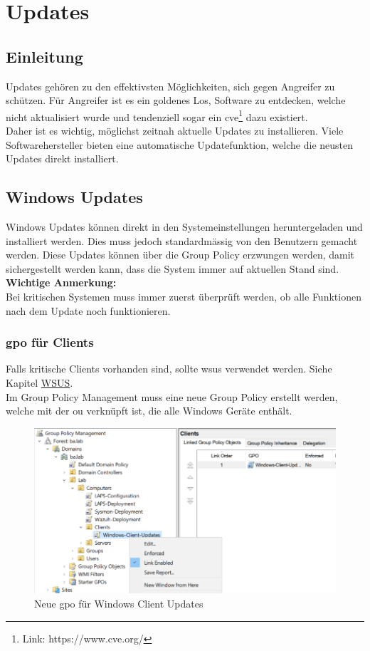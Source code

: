 \chapter{Updates}
\section{Einleitung}
Updates gehören zu den effektivsten Möglichkeiten, sich gegen Angreifer zu schützen.
Für Angreifer ist es ein goldenes Los, Software zu entdecken, welche nicht aktualisiert wurde und tendenziell sogar ein \acrfull{cve}\footnote{Link: https://www.cve.org/} dazu existiert.\\

Daher ist es wichtig, möglichst zeitnah aktuelle Updates zu installieren.
Viele Softwarehersteller bieten eine automatische Updatefunktion, welche die neusten Updates direkt installiert.

\section{Windows Updates}
Windows Updates können direkt in den Systemeinstellungen heruntergeladen und installiert werden.
Dies muss jedoch standardmässig von den Benutzern gemacht werden.
Diese Updates können über die Group Policy erzwungen werden, damit sichergestellt werden kann, dass die System immer auf aktuellen Stand sind.\\

\textbf{Wichtige Anmerkung:}\\
Bei kritischen Systemen muss immer zuerst überprüft werden, ob alle Funktionen nach dem Update noch funktionieren.


\subsection{\acrshort{gpo} für Clients}
Falls kritische Clients vorhanden sind, sollte \acrfull{wsus} verwendet werden. Siehe Kapitel \hyperref[subsec:wsus]{WSUS}.\\

Im Group Policy Management muss eine neue Group Policy erstellt werden, welche mit der \acrshort{ou} verknüpft ist, die alle Windows Geräte enthält.
\begin{figure}[H]
    \centering
    \includegraphics[width=0.7\linewidth]{../img/Updates/edit-gpo-clinets.png}
    \caption{Neue \acrshort{gpo} für Windows Client Updates}
\end{figure}

